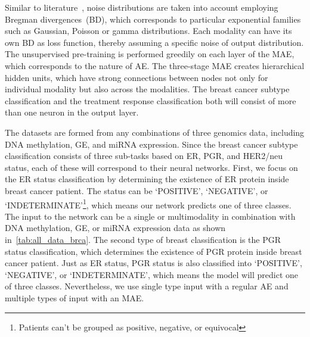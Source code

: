 \hspace*{3.5mm} Similar to literature~\cite{wang2018associativemulti,serban2016multi}, noise distributions are taken into account employing Bregman divergences~(BD), which corresponds to particular exponential families such as Gaussian, Poisson or gamma distributions. Each modality can have its own BD as loss function, thereby assuming a specific noise of output distribution. The unsupervised pre-training is performed greedily on each layer of the MAE, which corresponds to the nature of AE. The three-stage MAE creates hierarchical hidden units, which have strong connections between nodes not only for individual modality but also across the modalities. 
The breast cancer subtype classification and the treatment response classification both will consist of more than one neuron in the output layer. 

\hspace*{3.5mm} The datasets are formed from any combinations of three genomics data, including DNA methylation, GE, and miRNA expression. Since the breast cancer subtype classification consists of three sub-tasks based on ER, PGR, and HER2/neu status, each of these will correspond to their neural networks. First, we focus on the ER status classification by determining the existence of ER protein inside breast cancer patient. The status can be `POSITIVE', `NEGATIVE', or `INDETERMINATE'\footnote{Patients can't be grouped as positive, negative, or equivocal}, which means our network predicts one of three classes. The input to the network can be a single or multimodality in combination with DNA methylation, GE, or miRNA expression data as shown in~\cref{tab:all_data_brca}. The second type of breast classification is the PGR status classification, which determines the existence of PGR protein inside breast cancer patient. Just as ER status, PGR status is also classified into `POSITIVE', `NEGATIVE', or `INDETERMINATE', which means the model will predict one of three classes. Nevertheless, we use single type input with a regular AE and multiple types of input with an MAE. 

